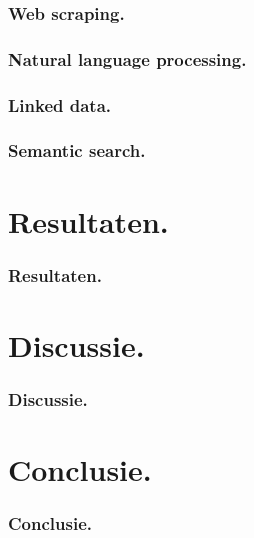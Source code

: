 \documentclass[aspectratio=169]{beamer}
\begin{document}
\begin{frame}
    \frametitle{Web scraping.}
    
    
\end{frame}

\begin{frame}
\frametitle{Natural language processing.}


\end{frame}

\begin{frame}
\frametitle{Linked data.}


\end{frame}

\begin{frame}
\frametitle{Semantic search.}


\end{frame}

\section{Resultaten.}

\begin{frame}
\frametitle{Resultaten.}


\end{frame}

\section{Discussie.}

\begin{frame}
\frametitle{Discussie.}


\end{frame}

\section{Conclusie.}

\begin{frame}
\frametitle{Conclusie.}


\end{frame}
\end{document}
